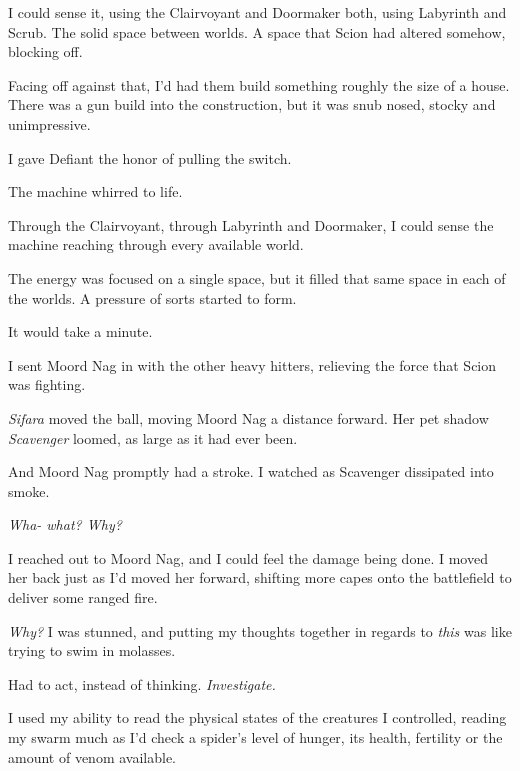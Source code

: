 I could sense it, using the Clairvoyant and Doormaker both, using Labyrinth and Scrub.  The solid space between worlds.  A space that Scion had altered somehow, blocking off.



Facing off against that, I'd had them build something roughly the size of a house.  There was a gun build into the construction, but it was snub nosed, stocky and unimpressive.



I gave Defiant the honor of pulling the switch.



The machine whirred to life.



Through the Clairvoyant, through Labyrinth and Doormaker, I could sense the machine reaching through every available world.



The energy was focused on a single space, but it filled that same space in each of the worlds.  A pressure of sorts started to form.



It would take a minute.



I sent Moord Nag in with the other heavy hitters, relieving the force that Scion was fighting.



\emph{Sifara} moved the ball, moving Moord Nag a distance forward.  Her pet shadow \emph{Scavenger} loomed, as large as it had ever been.



And Moord Nag promptly had a stroke.  I watched as Scavenger dissipated into smoke.



\emph{Wha- what?  Why?}



I reached out to Moord Nag, and I could feel the damage being done.  I moved her back just as I'd moved her forward, shifting more capes onto the battlefield to deliver some ranged fire.



\emph{Why?}  I was stunned, and putting my thoughts together in regards to \emph{this} was like trying to swim in molasses.



Had to act, instead of thinking.  \emph{Investigate.}



I used my ability to read the physical states of the creatures I controlled, reading my swarm much as I'd check a spider's level of hunger, its health, fertility or the amount of venom available.




